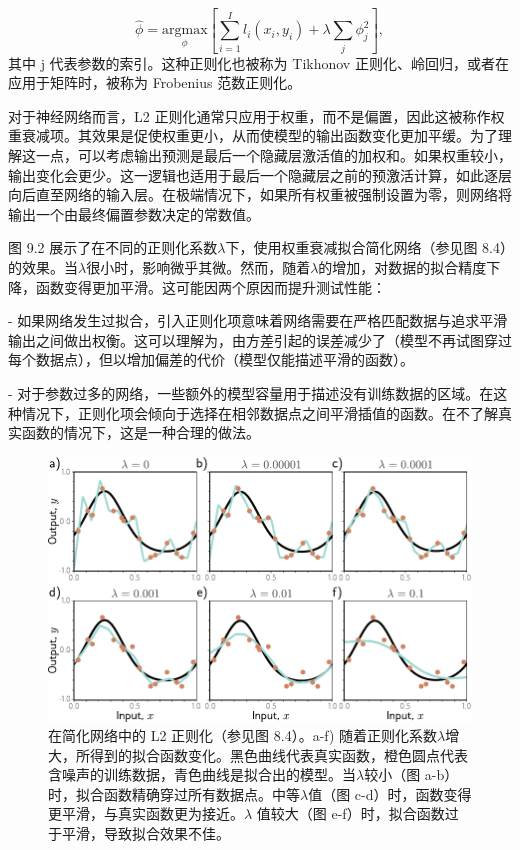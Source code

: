 \documentclass[lang=cn,newtx,10pt,scheme=chinese]{elegantbook}
\begin{document}
\begin{equation}
\hat{\phi} = \underset{\phi}{\mathrm{argmax}} \left[ \sum_{i=1}^I l_i(x_i, y_i) + \lambda \sum_j \phi_j^2 \right], 
\end{equation}
其中 j 代表参数的索引。这种正则化也被称为 Tikhonov 正则化、岭回归，或者在应用于矩阵时，被称为 Frobenius 范数正则化。

对于神经网络而言，L2 正则化通常只应用于权重，而不是偏置，因此这被称作权重衰减项。其效果是促使权重更小，从而使模型的输出函数变化更加平缓。为了理解这一点，可以考虑输出预测是最后一个隐藏层激活值的加权和。如果权重较小，输出变化会更少。这一逻辑也适用于最后一个隐藏层之前的预激活计算，如此逐层向后直至网络的输入层。在极端情况下，如果所有权重被强制设置为零，则网络将输出一个由最终偏置参数决定的常数值。

图 9.2 展示了在不同的正则化系数\(\lambda\)下，使用权重衰减拟合简化网络（参见图 8.4）的效果。当\(\lambda\)很小时，影响微乎其微。然而，随着\(\lambda\)的增加，对数据的拟合精度下降，函数变得更加平滑。这可能因两个原因而提升测试性能：

- 如果网络发生过拟合，引入正则化项意味着网络需要在严格匹配数据与追求平滑输出之间做出权衡。这可以理解为，由方差引起的误差减少了（模型不再试图穿过每个数据点），但以增加偏差的代价（模型仅能描述平滑的函数）。

- 对于参数过多的网络，一些额外的模型容量用于描述没有训练数据的区域。在这种情况下，正则化项会倾向于选择在相邻数据点之间平滑插值的函数。在不了解真实函数的情况下，这是一种合理的做法。

\begin{figure}[ht!]
	\centering
	\includegraphics[width=0.7\linewidth]{PDFFigures/UDLChap9PDF/RegExplicitPractice.pdf}
	\caption{在简化网络中的 L2 正则化（参见图 8.4）。a-f) 随着正则化系数\(\lambda\)增大，所得到的拟合函数变化。黑色曲线代表真实函数，橙色圆点代表含噪声的训练数据，青色曲线是拟合出的模型。当\(\lambda\)较小（图 a-b）时，拟合函数精确穿过所有数据点。中等\(\lambda\)值（图 c-d）时，函数变得更平滑，与真实函数更为接近。\(\lambda\) 值较大（图 e-f）时，拟合函数过于平滑，导致拟合效果不佳。}
\end{figure}
\end{document}
